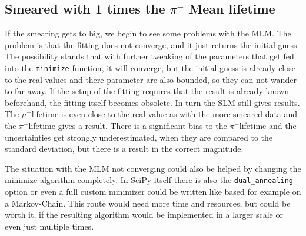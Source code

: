 \documentclass[11pt, a4paper, oneside]{book}
\newcommand{\pion}{$\pi^{-}$}
\newcommand{\muon}{$\mu^{-}$}
\begin{document}
\FloatBarrier
\subsection{Smeared with 1 times the \texorpdfstring{\pion}{pion} Mean lifetime}

If the smearing gets to big, we begin to see some problems with the MLM. The problem is that the fitting does not converge, and it just returns the initial guess. The possibility stands that with further tweaking of the parameters that get fed into the \lstinline{minimize} function, it will converge, but the initial guess is already close to the real values and there parameter are also bounded, so they can not wander to far away. If the setup of the fitting requires that the result is already known beforehand, the fitting itself becomes obsolete. In turn the SLM still gives results. The \muon lifetime is even close to the real value as with the more smeared data and the \pion lifetime gives a result. There is a significant bias to the \pion lifetime and the uncertainties get strongly underestimated, when they are compared to the standard deviation, but there is a result in the correct magnitude.

The situation with the MLM not converging could also be helped by changing the minimize-algorithm completely. In SciPy itself there is also the \lstinline{dual_annealing} option or even a full custom minimizer could be written like based for example on a Markov-Chain. This route would need more time and resources, but could be worth it, if the resulting algorithm would be implemented in a larger scale or even just multiple times.
\end{document}
